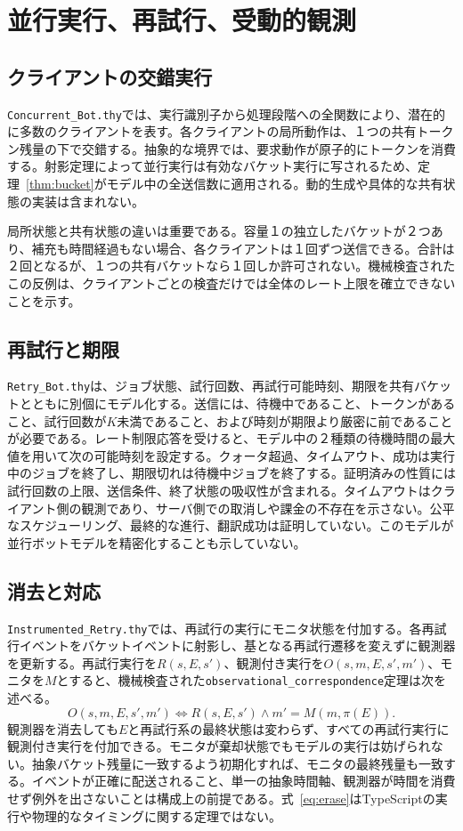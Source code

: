 \documentclass[10pt,twocolumn]{ltjsarticle}
\begin{document}
\section{並行実行、再試行、受動的観測}
\subsection{クライアントの交錯実行}
\texttt{Concurrent\_Bot.thy}では、実行識別子から処理段階への全関数により、潜在的に多数のクライアントを表す。各クライアントの局所動作は、１つの共有トークン残量の下で交錯する。抽象的な境界では、要求動作が原子的にトークンを消費する。射影定理によって並行実行は有効なバケット実行に写されるため、定理~\ref{thm:bucket}がモデル中の全送信数に適用される。動的生成や具体的な共有状態の実装は含まれない。

局所状態と共有状態の違いは重要である。容量１の独立したバケットが２つあり、補充も時間経過もない場合、各クライアントは１回ずつ送信できる。合計は２回となるが、１つの共有バケットなら１回しか許可されない。機械検査されたこの反例は、クライアントごとの検査だけでは全体のレート上限を確立できないことを示す。

\subsection{再試行と期限}
\texttt{Retry\_Bot.thy}は、ジョブ状態、試行回数、再試行可能時刻、期限を共有バケットとともに別個にモデル化する。送信には、待機中であること、トークンがあること、試行回数が$K$未満であること、および時刻が期限より厳密に前であることが必要である。レート制限応答を受けると、モデル中の２種類の待機時間の最大値を用いて次の可能時刻を設定する。クォータ超過、タイムアウト、成功は実行中のジョブを終了し、期限切れは待機中ジョブを終了する。証明済みの性質には試行回数の上限、送信条件、終了状態の吸収性が含まれる。タイムアウトはクライアント側の観測であり、サーバ側での取消しや課金の不存在を示さない。公平なスケジューリング、最終的な進行、翻訳成功は証明していない。このモデルが並行ボットモデルを精密化することも示していない。

\subsection{消去と対応}
\texttt{Instrumented\_Retry.thy}では、再試行の実行にモニタ状態を付加する。各再試行イベントをバケットイベントに射影し、基となる再試行遷移を変えずに観測器を更新する。再試行実行を$R(s,E,s')$、観測付き実行を$O(s,m,E,s',m')$、モニタを$M$とすると、機械検査された\texttt{observational\_correspondence}定理は次を述べる。
\begin{equation}\label{eq:erase}
 O(s,m,E,s',m')\iff R(s,E,s')\land m'=M(m,\pi(E)).
\end{equation}
観測器を消去しても$E$と再試行系の最終状態は変わらず、すべての再試行実行に観測付き実行を付加できる。モニタが棄却状態でもモデルの実行は妨げられない。抽象バケット残量に一致するよう初期化すれば、モニタの最終残量も一致する。イベントが正確に配送されること、単一の抽象時間軸、観測器が時間を消費せず例外を出さないことは構成上の前提である。式~\eqref{eq:erase}はTypeScriptの実行や物理的なタイミングに関する定理ではない。
\end{document}
